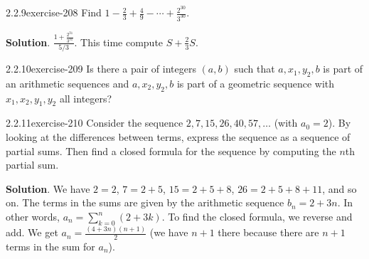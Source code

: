 \documentclass[twoside,11pt,]{book}
\numberwithin{equation}{chapter}
\begin{document}
\begin{divisionsolution}{2.2.9}{}{exercise-208}%
\hypertarget{p-3253}{}%
Find \(1 - \frac{2}{3} + \frac{4}{9} - \cdots + \frac{2^{30}}{3^{30}}\text{.}\)%
\par\smallskip%
\noindent\textbf{Solution}.\quad%
\hypertarget{p-3255}{}%
\(\frac{1 + \frac{2^{31}}{3^{31}}}{5/3}\text{.}\) This time compute \(S + \frac{2}{3}S\text{.}\)%
\end{divisionsolution}%
\begin{divisionsolution}{2.2.10}{}{exercise-209}%
\hypertarget{p-3256}{}%
Is there a pair of integers \((a,b)\) such that \(a,
x_1, y_2, b\) is part of an arithmetic sequences and \(a,
x_2, y_2, b\) is part of a geometric sequence with \(x_1, x_2, y_1, y_2\) all integers?%
\end{divisionsolution}%
\begin{divisionsolution}{2.2.11}{}{exercise-210}%
\hypertarget{p-3257}{}%
Consider the sequence \(2, 7, 15, 26, 40, 57, \ldots\) (with \(a_0 = 2\)). By looking at the differences between terms, express the sequence as a sequence of partial sums. Then find a closed formula for the sequence by computing the \(n\)th partial sum.%
\par\smallskip%
\noindent\textbf{Solution}.\quad%
\hypertarget{p-3258}{}%
We have \(2 = 2\), \(7 = 2+5\), \(15 = 2 + 5 + 8\), \(26 = 2+5+8+11\), and so on. The terms in the sums are given by the arithmetic sequence \(b_n = 2+3n\). In other words, \(a_n = \sum_{k=0}^n (2+3k)\). To find the closed formula, we reverse and add. We get \(a_n = \frac{(4+3n)(n+1)}{2}\) (we have \(n+1\) there because there are \(n+1\) terms in the sum for \(a_n\)).%
\end{divisionsolution}%
\end{document}
